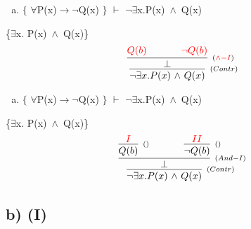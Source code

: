 \documentclass[aspectratio=43]{beamer}
\newcommand{\ria}{$\rightarrow$}
\newcommand{\fall}{$\forall$}
\newcommand{\ex}{$\exists$}
\newcommand{\nao}{$\neg$}
\newcommand{\nex}{\nao\ex}
\newcommand{\andd}{$\wedge$}
\begin{document}
    \begin{frame}[fragile]
    	
    	\begin{enumerate}[b)]
			
			\item $\{$ \fall P(x)\ria \nao Q(x) $\}$ $\vdash$ \nex  x.P(x)\ \andd\ Q(x) \\ 
			
		\end{enumerate}
        \{\ex  x. P(x)\ \andd\ Q(x)\}
        \vspace{95pt}
        \[
        \begin{array}{c}
		
        	\infer[_{(Contr)}]
            {$\nex$  x. P(x)\ $\andd$\ Q(x)}
            {\infer[_{(\textcolor{red}{\land-I})}] 
            	{\bot}
                { \textcolor{red}{ Q(b) \hspace{35pt} \neg Q(b)}}
        	}
		\end{array}
        \]
        
	\end{frame}
    
    \begin{frame}[fragile]
    	
    	\begin{enumerate}[b)]
			
			\item $\{$ \fall P(x)\ria \nao Q(x) $\}$ $\vdash$ \nex  x.P(x)\ \andd\ Q(x) \\ 
			
		\end{enumerate}
        \{\ex  x. P(x)\ \andd\ Q(x)\}
        \vspace{100pt}
        \[
        \begin{array}{c}
		
        	\infer[_{(Contr)}]
            {$\nex$  x. P(x)\ $\andd$\ Q(x)}
            {\infer[_{(And-I)}] 
            	{\bot}
                {\infer[_{()}]
                	{Q(b)}
                    {\textcolor{red}{I}}
                \hspace{35pt} 
                \infer[_{()}]
                	{$\nao$Q(b)}
                    {\textcolor{red}{II}}
                }
        	}
		\end{array}
        \]
        
	\end{frame}
    
    \subsection{b) (I)}
    
\end{document}
